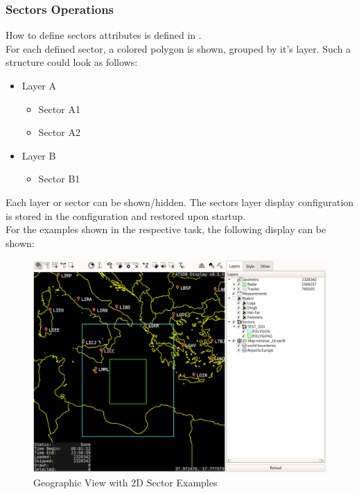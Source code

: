 \subsubsection{Sectors Operations}
\label{sec:geo_sectors_ops}  

How to define sectors attributes is defined in . \\

For each defined sector, a colored polygon is shown, grouped by it's layer. Such a structure could look as follows:

\begin{itemize}
 \item Layer A
 \begin{itemize}
 \item Sector A1
 \item Sector A2
\end{itemize} 
 \item Layer B
  \begin{itemize}
 \item Sector B1
\end{itemize} 
\end{itemize}

Each layer or sector can be shown/hidden. The sectors layer display configuration is stored in the configuration and restored upon startup. \\

For the examples shown in the respective task, the following display can be shown:

\begin{figure}[H]
    \hspace*{-2.5cm}
    \includegraphics[width=19cm]{figures/geoview_sectors2d.png}
  \caption{Geographic View with 2D Sector Examples}
\end{figure}

